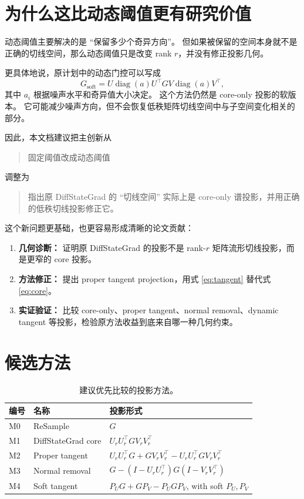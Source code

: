 \documentclass[11pt]{article}
\begin{document}
\section{为什么这比动态阈值更有研究价值}

动态阈值主要解决的是 ``保留多少个奇异方向''。
但如果被保留的空间本身就不是正确的切线空间，那么动态阈值只是改变 rank $r$，并没有修正投影几何。

更具体地说，原计划中的动态门控可以写成
\[
    G_{\mathrm{soft}}
    =
    U \operatorname{diag}(a) U^\top
    G
    V \operatorname{diag}(a) V^\top ,
\]
其中 $a_i$ 根据噪声水平和奇异值大小决定。
这个方法仍然是 core-only 投影的软版本。
它可能减少噪声方向，但不会恢复低秩矩阵切线空间中与子空间变化相关的部分。

因此，本文档建议把主创新从
\begin{quote}
固定阈值改成动态阈值
\end{quote}
调整为
\begin{quote}
指出原 DiffStateGrad 的 ``切线空间'' 实际上是 core-only 谱投影，并用正确的低秩切线投影修正它。
\end{quote}

这个新问题更基础，也更容易形成清晰的论文贡献：
\begin{enumerate}[label=\textbf{C\arabic*.}]
    \item \textbf{几何诊断：} 证明原 DiffStateGrad 的投影不是 rank-$r$ 矩阵流形切线投影，而是更窄的 core 投影。
    \item \textbf{方法修正：} 提出 proper tangent projection，用式 \eqref{eq:tangent} 替代式 \eqref{eq:core}。
    \item \textbf{实证验证：} 比较 core-only、proper tangent、normal removal、dynamic tangent 等投影，检验原方法收益到底来自哪一种几何约束。
\end{enumerate}

\section{候选方法}

\begin{table}[h]
\centering
\caption{建议优先比较的投影方法。}
\label{tab:methods}
\begin{tabular}{lll}
\toprule
编号 & 名称 & 投影形式 \\
\midrule
M0 & ReSample & $G$ \\
M1 & DiffStateGrad core & $U_r U_r^\top G V_r V_r^\top$ \\
M2 & Proper tangent & $U_r U_r^\top G + G V_r V_r^\top - U_r U_r^\top G V_r V_r^\top$ \\
M3 & Normal removal & $G - (I-U_rU_r^\top)G(I-V_rV_r^\top)$ \\
M4 & Soft tangent & $P_U G + G P_V - P_U G P_V$, with soft $P_U,P_V$ \\
\bottomrule
\end{tabular}
\end{table}
\end{document}
